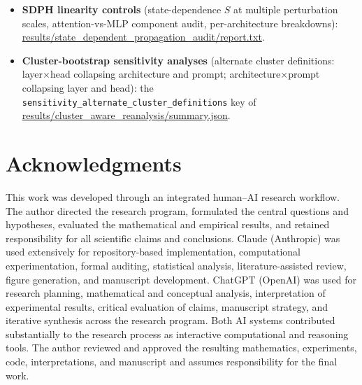\documentclass[11pt]{article}
\begin{document}
\begin{small}
\begin{itemize}[nosep]
\url{results/functional_propagation_audit/cases.json}.
\item \textbf{SDPH linearity controls} (state-dependence $S$ at multiple
perturbation scales, attention-vs-MLP component audit, per-architecture
breakdowns): \url{results/state_dependent_propagation_audit/report.txt}.
\item \textbf{Cluster-bootstrap sensitivity analyses} (alternate cluster
definitions: layer$\times$head collapsing architecture and prompt;
architecture$\times$prompt collapsing layer and head): the
\texttt{sensitivity\allowbreak\_alternate\allowbreak\_cluster\allowbreak\_definitions}
key of \url{results/cluster_aware_reanalysis/summary.json}.
\end{itemize}
\end{small}

\section*{Acknowledgments}

This work was developed through an integrated human--AI research workflow.
The author directed the research program, formulated the central questions
and hypotheses, evaluated the mathematical and empirical results, and
retained responsibility for all scientific claims and conclusions. Claude
(Anthropic) was used extensively for repository-based implementation,
computational experimentation, formal auditing, statistical analysis,
literature-assisted review, figure generation, and manuscript development.
ChatGPT (OpenAI) was used for research planning, mathematical and
conceptual analysis, interpretation of experimental results, critical
evaluation of claims, manuscript strategy, and iterative synthesis across
the research program. Both AI systems contributed substantially to the
research process as interactive computational and reasoning tools. The
author reviewed and approved the resulting mathematics, experiments, code,
interpretations, and manuscript and assumes responsibility for the final
work.
\end{document}
